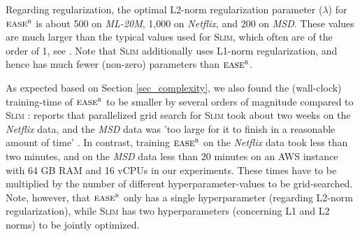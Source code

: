 \documentclass[sigconf]{acmart}
\newcommand{\slim}{{\scshape Slim}}
\newcommand{\sae}{${\textsc{ease}}^{\textsc{r}}$}
\begin{document}
Regarding regularization,  the optimal L2-norm regularization parameter ($\lambda$) for \sae{}   is about 500 on \emph{ML-20M}, 1,000 on \emph{Netflix}, and 200 on \emph{MSD}. These values are much larger than the typical values used for \slim{}, which often are of the order of 1, see \cite{ning11}. Note that \slim{} additionally uses L1-norm regularization, and hence has much fewer (non-zero) parameters than \sae.  

As expected based on Section \ref{sec_complexity}, we also found the (wall-clock) training-time of \sae{}  to be smaller by several orders of magnitude compared to \slim{} : \cite{liang18} reports that parallelized grid search for \slim{} took about two weeks on the \emph{Netflix} data, and the \emph{MSD} data was 'too large for it to finish in a reasonable amount of time' \cite{liang18}. In contrast,  training \sae{}  on the \emph{Netflix} data took less than two minutes, and on the  \emph{MSD} data less than 20 minutes on an AWS instance with 64 GB RAM and 16 vCPUs in our experiments. These times have to be multiplied by the number of different hyperparameter-values to be grid-searched.  Note, however, that \sae{}  only has a single hyperparameter (regarding L2-norm regularization), while \slim{} has two hyperparameters (concerning L1 and L2 norms) to be jointly optimized.
\end{document}
